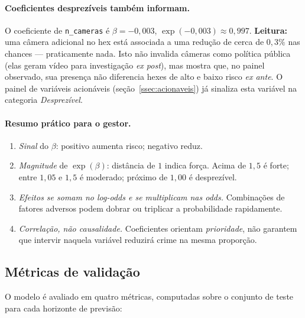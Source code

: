 \documentclass[11pt,a4paper]{article}
\begin{document}
\paragraph{Coeficientes desprezíveis também informam.} O coeficiente
de \texttt{n\_cameras} é $\beta = -0{,}003$, $\exp(-0{,}003) \approx
0{,}997$. \textbf{Leitura:} uma câmera adicional no hex está associada
a uma redução de cerca de $0{,}3\%$ nas chances --- praticamente
nada. Isto não invalida câmeras como política pública (elas geram
vídeo para investigação \emph{ex post}), mas mostra que, no painel
observado, sua presença não diferencia hexes de alto e baixo risco
\emph{ex ante}. O painel de variáveis acionáveis
(seção~\ref{ssec:acionaveis}) já sinaliza esta variável na categoria
\emph{Desprezível}.

\paragraph{Resumo prático para o gestor.}
\begin{enumerate}
  \item \emph{Sinal} do $\beta$: positivo aumenta risco; negativo reduz.
  \item \emph{Magnitude} de $\exp(\beta)$: distância de $1$ indica força.
        Acima de $1{,}5$ é forte; entre $1{,}05$ e $1{,}5$ é moderado;
        próximo de $1{,}00$ é desprezível.
  \item \emph{Efeitos se somam no log-odds e se multiplicam nas odds.}
        Combinações de fatores adversos podem dobrar ou triplicar a
        probabilidade rapidamente.
  \item \emph{Correlação, não causalidade.} Coeficientes orientam
        \emph{prioridade}, não garantem que intervir naquela variável
        reduzirá crime na mesma proporção.
\end{enumerate}

\subsection{Métricas de validação}
\label{ssec:pred_metrics}

O modelo é avaliado em quatro métricas, computadas sobre o conjunto de
teste para cada horizonte de previsão:
\end{document}
